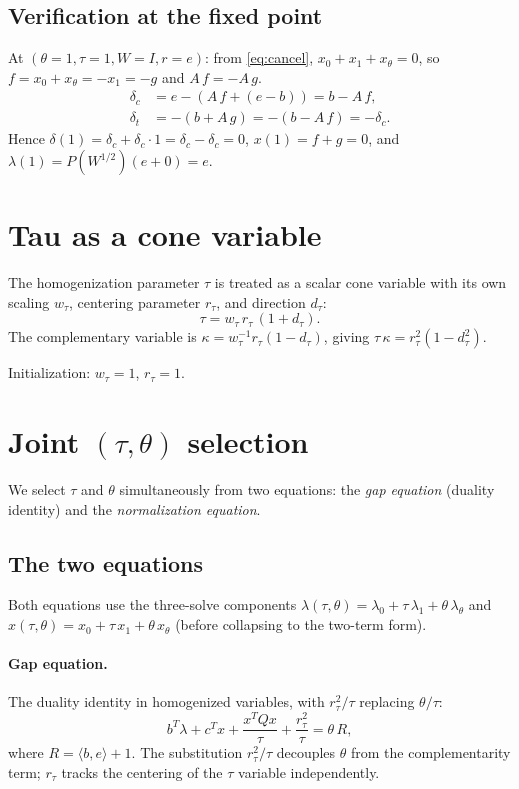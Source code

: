 \documentclass{article}
\newcommand{\PW}{P(W^{1/2})}
\newcommand{\ip}[2]{\langle #1, #2 \rangle}
\begin{document}
\subsection{Verification at the fixed point}

At $(\theta=1, \tau=1, W=I, r=e)$:
from \eqref{eq:cancel}, $x_0 + x_1 + x_\theta = 0$, so
$f = x_0 + x_\theta = -x_1 = -g$ and $A\,f = -A\,g$.
\begin{align*}
  \delta_c &= e - (A\,f + (e-b)) = b - A\,f, \\
  \delta_t &= -(b + A\,g) = -(b - A\,f) = -\delta_c.
\end{align*}
Hence $\delta(1) = \delta_c + \delta_c \cdot 1 = \delta_c - \delta_c = 0$,\;
$x(1) = f + g = 0$,\; and
$\lambda(1) = \PW(e + 0) = e$.\;\checkmark

\section{Tau as a cone variable}

The homogenization parameter $\tau$ is treated as a scalar cone
variable with its own scaling $w_\tau$, centering parameter $r_\tau$,
and direction $d_\tau$:
\begin{equation}\label{eq:tau-param}
  \tau = w_\tau \, r_\tau \, (1 + d_\tau).
\end{equation}
The complementary variable is $\kappa = w_\tau^{-1} r_\tau (1-d_\tau)$,
giving $\tau\,\kappa = r_\tau^2(1-d_\tau^2)$.

Initialization: $w_\tau = 1$, $r_\tau = 1$.

\section{Joint $(\tau,\theta)$ selection}

We select $\tau$ and $\theta$ simultaneously from two equations:
the \emph{gap equation} (duality identity) and the
\emph{normalization equation}.

\subsection{The two equations}

Both equations use the three-solve components
$\lambda(\tau,\theta) = \lambda_0 + \tau\,\lambda_1 + \theta\,\lambda_\theta$
and $x(\tau,\theta) = x_0 + \tau\,x_1 + \theta\,x_\theta$
(before collapsing to the two-term form).

\paragraph{Gap equation.}
The duality identity in homogenized variables, with
$r_\tau^2/\tau$ replacing $\theta/\tau$:
\begin{equation}\label{eq:duality}
  b^T \lambda + c^T x + \frac{x^T Q x}{\tau}
    + \frac{r_\tau^2}{\tau}
  = \theta\,R,
\end{equation}
where $R = \ip{b}{e} + 1$.  The substitution $r_\tau^2/\tau$
decouples $\theta$ from the complementarity term; $r_\tau$ tracks
the centering of the $\tau$ variable independently.
\end{document}
